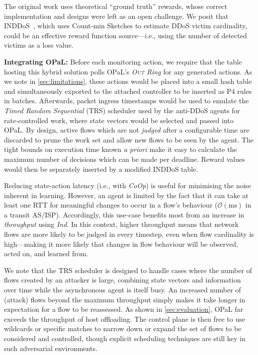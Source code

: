 \documentclass[
sigconf,natbib=false
]{acmart}
\newcommand{\fakepara}[1]{\noindent\textbf{#1:}}
\newcommand{\approachshort}{OPaL}
\newcommand{\Coopfw}{\emph{CoOp}}
\newcommand{\Indfw}{\emph{Ind}}
\newcommand{\outring}{\textsc{Out}}
\begin{document}
The original work uses theoretical ``ground truth'' rewards, whose correct implementation and designs were left as an open challenge. 
We posit that INDDoS~\parencite{tnms-ddos-victim-ident}, which uses Count-min Sketches to estimate DDoS victim cardinality, could be an effective reward function source---i.e., using the number of detected victims as a loss value.

\fakepara{Integrating \approachshort}
Before each monitoring action, we require that the table hosting this hybrid solution polls \approachshort{}'s \emph{\outring{} Ring} for any generated actions.
As we note in \cref{sec:limitations}, these actions would be placed into a small hash table and simultaneously exported to the attached controller to be inserted as P4 rules in batches.
Afterwards, packet ingress timestamps would be used to emulate the \emph{Timed Random Sequential} (TRS) scheduler used by the anti-DDoS agents for rate-controlled work, where state vectors would be selected and passed into \approachshort.
By design, active flows which are not \emph{judged} after a configurable time are discarded to prune the work set and allow new flows to be seen by the agent.
The tight bounds on execution time known \emph{a priori} make it easy to calculate the maximum number of decisions which can be made per deadline.
Reward values would then be separately inserted by a modified INDDoS table.


Reducing state-action latency (i.e., with \Coopfw) is useful for minimising the noise inherent in learning.
However, an agent is limited by the fact that it can take at least one RTT for meaningful changes to occur in a flow's behaviour ($\mathcal{O}{\left(\si{\milli\second}\right)}$ in a transit AS/ISP).
Accordingly, this use-case benefits most from an increase in \emph{throughput} using \Indfw{}.
In this context, higher throughput means that network flows are more likely to be judged in every timestep, even when flow cardinality is high---making it more likely that changes in flow behaviour will be observed, acted on, and learned from.

We note that the TRS scheduler is designed to handle cases where the number of flows created by an attacker is large, combining state vectors and information over time while the asynchronous agent is itself busy.
An increased number of (attack) flows beyond the maximum throughput simply makes it take longer in expectation for a flow to be reassessed.
As shown in \cref{sec:evaluation}, \approachshort{} far exceeds the throughput of host offloading.
The control plane is then free to use wildcards or specific matches to narrow down or expand the set of flows to be considered and controlled, though explicit scheduling techniques are still key in such adversarial environments.
\end{document}
